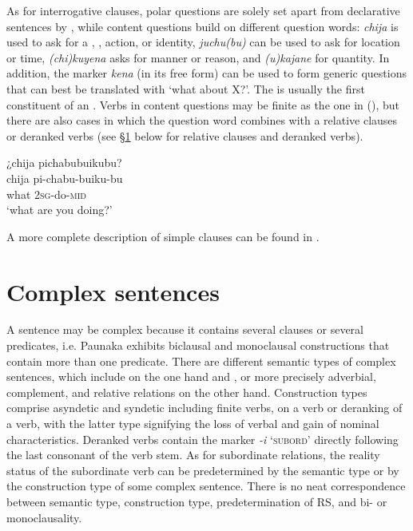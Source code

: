 As for interrogative clauses, polar questions are solely set apart from declarative sentences by , while content questions build on different question words: \textit{chija} is used to ask for a , , action, or identity, \textit{juchu(bu)} can be used to ask for location or time, \textit{(chi)kuyena} asks for manner or reason, and \textit{(u)kajane} for quantity. In addition, the  marker \textit{kena} (in its free form) can be used to form generic questions that can best be translated with ‘what about X?’. The  is usually the first constituent of an . Verbs in content questions may be finite as the one in (), but there are also cases in which the question word combines with a relative clauses or deranked verbs (see §\ref{sec:O_ComplexSentences} below for relative clauses and deranked verbs).

\ea\label{ex:Sketch-Qcont}
\begingl
\glpreamble ¿chija pichabubuikubu?\\
\gla chija pi-chabu-buiku-bu\\
\glb what 2\textsc{sg}-do-\textsc{mid}\\
\glft ‘what are you doing?’\\
\endgl
\xe

A more complete description of simple clauses can be found in .

\section{Complex sentences}\label{sec:O_ComplexSentences}

A sentence may be complex because it contains several clauses or several predicates, i.e. Paunaka exhibits biclausal and monoclausal constructions that contain more than one predicate. There are different semantic types of complex sentences, which include  on the one hand and , or more precisely adverbial, complement, and relative relations on the other hand. Construction types comprise asyndetic and syndetic  including finite verbs,  on a verb or deranking of a verb, with the latter type signifying the loss of verbal and gain of nominal characteristics. Deranked verbs contain the marker \textit{-i} ‘\textsc{subord}’ directly following the last consonant of the verb stem. As for subordinate relations, the reality status  of the subordinate verb can be predetermined by the semantic type or by the construction type of some complex sentence. There is no neat correspondence between semantic type, construction type, predetermination of RS, and bi- or monoclausality.

